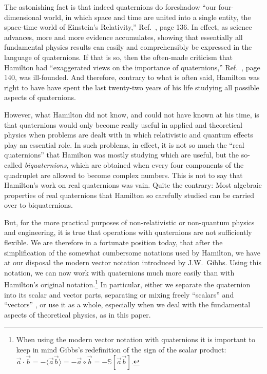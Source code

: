 \documentclass [12pt,a4paper      ]{article}
\newcommand{\Scal}{\mathbb{S}}        %
\newcommand{\scal}{\circ}             %
\newcommand{\SCA}{\langle}            %
\newcommand{\LAR}{\rangle}            %
\begin{document}
    The astonishing fact is that indeed quaternions do foreshadow 
``our four-dimensional world,  in which space and time are  united 
into  a  single  entity,   the  space-time  world  of  Einstein's 
Relativity,'' Ref.~\cite{R2}, page 136.  In effect, as science advances, more 
and  more  evidence  accumulates,  showing that  essentially  all 
fundamental  physics  results can easily  and  comprehensibly  be 
expressed in the language of quaternions. If that is so, then the 
often-made  criticism that Hamilton had ``exaggerated views on the 
importance of quaternions,'' Ref.~\cite{R2}, page 140, was ill-founded.  And 
therefore,  contrary to what is often said,  Hamilton  was right  
to have have spent the last twenty-two years of his life  studying 
all possible aspects of quaternions.

     However,  what  Hamilton  did not know,  and could not  have 
known at his time,  is that quaternions would only become really 
useful in applied and theoretical physics when problems are dealt 
with in which  relativistic  and quantum effects play an essential 
role.   In such problems,  in effect, it is not so much the ``real 
quaternions'' that Hamilton was mostly studying which are useful, but the so-called \emph{biquaternions},  which are obtained when every  four 
components  of  the  quadruplet are  allowed  to  become  complex 
numbers.   This  is  not  to  say that Hamilton's  work  on  real 
quaternions  was  vain.    Quite  the  contrary:  Most  algebraic 
properties of real quaternions that Hamilton so carefully studied 
can be carried over to biquaternions.

     But, for the more practical purposes of non-relativistic 
or  non-quantum  physics  and  engineering,   it  is  true   that 
operations  with quaternions are not sufficiently  flexible.   We 
are therefore  in  a fortunate position  today,  that  after  the 
simplification of the somewhat cumbersome notations used by 
Hamilton,  we  have  at our disposal the modern  vector  notation 
introduced by J.W.\ Gibbs.  Using this notation, we can now work 
with  quaternions much more easily than with Hamilton's  original 
notation.\footnote{When using the modern vector notation with quaternions it is important to keep in mind Gibbs's redefinition of the sign of the scalar product: ~~~ $\vec{a}\cdot\vec{b}  = -\SCA\vec{a}\vec{b}\LAR = -\vec{a} \scal \vec{b} = -\Scal[\vec{a}\vec{b}]$.}   In particular,  either we separate the quaternion into 
its  scalar  and  vector  parts,   separating  or  mixing  freely 
``scalars''  and ``vectors'' \cite{R3},  or use it as a  whole,  especially 
when we deal with the fundamental aspects of theoretical physics, 
as in this paper.
\end{document}
